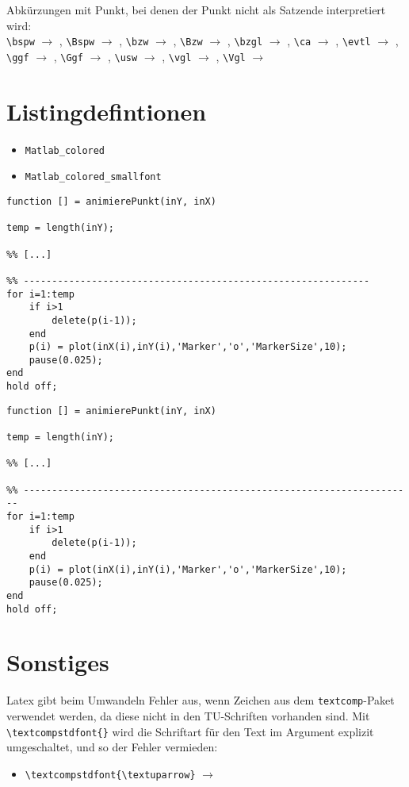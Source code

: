 \vspace{1ex}
\noindent Abkürzungen mit Punkt, bei denen der Punkt nicht als Satzende interpretiert wird:\\
\verb|\bspw| $\rightarrow$ \bspw, \verb|\Bspw| $\rightarrow$ \Bspw, \verb|\bzw| $\rightarrow$ \bzw, \verb|\Bzw| $\rightarrow$ \Bzw,  \verb|\bzgl| $\rightarrow$ \bzgl, \verb|\ca| $\rightarrow$ \ca, \verb|\evtl| $\rightarrow$ \evtl, \verb|\ggf| $\rightarrow$ \ggf, \verb|\Ggf| $\rightarrow$ \Ggf, \verb|\usw| $\rightarrow$ \usw, \verb|\vgl| $\rightarrow$ \vgl, \verb|\Vgl| $\rightarrow$ \Vgl



\section*{Listingdefintionen}
\begin{itemize}
	\item \verb|Matlab_colored|
	\item \verb|Matlab_colored_smallfont|
\end{itemize}


\begin{lstlisting}[style=Matlab_colored, caption = {Beispiellisting, style=Matlab\_colored}, label={lst:Listing1}]
function [] = animierePunkt(inY, inX)

temp = length(inY);

%% [...]

%% -------------------------------------------------------------
for i=1:temp
    if i>1
        delete(p(i-1));
    end
    p(i) = plot(inX(i),inY(i),'Marker','o','MarkerSize',10);
    pause(0.025);
end
hold off;
\end{lstlisting}


\begin{lstlisting}[style=Matlab_colored_smallfont, caption = {Beispiellisting, style=Matlab\_colored\_smallfont}, label={lst:Listing2}]
function [] = animierePunkt(inY, inX)

temp = length(inY);

%% [...]

%% ---------------------------------------------------------------------
for i=1:temp
    if i>1
        delete(p(i-1));
    end
    p(i) = plot(inX(i),inY(i),'Marker','o','MarkerSize',10);
    pause(0.025);
end
hold off;
\end{lstlisting}

\section*{Sonstiges}
Latex gibt beim Umwandeln \zT Fehler aus, wenn Zeichen aus dem \texttt{textcomp}-Paket verwendet werden, da diese nicht in den TU-Schriften vorhanden sind.
Mit \verb|\textcompstdfont{}| wird die Schriftart für den Text im Argument explizit umgeschaltet, und so der Fehler vermieden:
\begin{itemize}
	\item \verb|\textcompstdfont{\textuparrow}| $\rightarrow$ \textcompstdfont{\textuparrow}
\end{itemize}